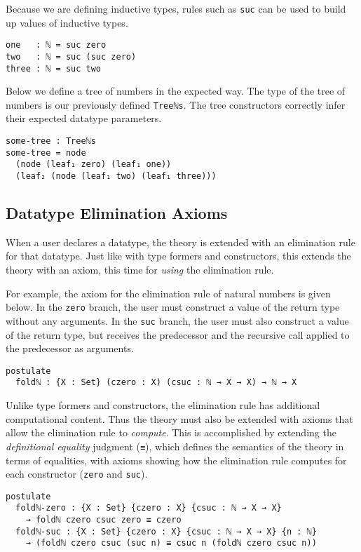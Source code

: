 \documentclass[runningheads,a4paper]{llncs}
\begin{document}
Because we are defining inductive types, rules such as {\tt suc} can
be used to build up values of inductive types.

\begin{verbatim}
one   : ℕ = suc zero
two   : ℕ = suc (suc zero)
three : ℕ = suc two
\end{verbatim}

Below we define a tree of numbers in the expected way. The type of the
tree of numbers is our previously defined {\tt Treeℕs}. The tree
constructors correctly infer their expected datatype parameters.

\begin{verbatim}
some-tree : Treeℕs
some-tree = node
  (node (leaf₁ zero) (leaf₁ one))
  (leaf₂ (node (leaf₁ two) (leaf₁ three)))
\end{verbatim}

\subsection{Datatype Elimination Axioms}

When a user declares a datatype, the theory is extended with an
elimination rule for that datatype. Just like with type formers and
constructors, this extends the theory with an axiom,
this time for {\it using} the elimination rule.

For example, the axiom for the elimination rule of natural numbers
is given below. In the {\tt zero} branch, the user must construct a value of
the return type without any arguments. In the {\tt suc} branch, the
user must also construct a value of the return type, but receives
the predecessor and the recursive call applied to the predecessor as
arguments.

\begin{verbatim}
postulate
  foldℕ : {X : Set} (czero : X) (csuc : ℕ → X → X) → ℕ → X
\end{verbatim}

Unlike type formers and constructors, the elimination rule has
additional computational content. Thus the theory must also be
extended with axioms that allow the elimination rule to {\it compute}.
This is accomplished by extending the
{\it definitional equality} judgment ({\tt ≡}), which defines the
semantics of the theory in terms of equalities, with axioms showing how
the elimination rule computes for each constructor ({\tt zero} and
{\tt suc}).

\begin{verbatim}
postulate
  foldℕ-zero : {X : Set} {czero : X} {csuc : ℕ → X → X}
    → foldℕ czero csuc zero ≡ czero
  foldℕ-suc : {X : Set} {czero : X} {csuc : ℕ → X → X} {n : ℕ}
    → (foldℕ czero csuc (suc n) ≡ csuc n (foldℕ czero csuc n))
\end{verbatim}
\end{document}
